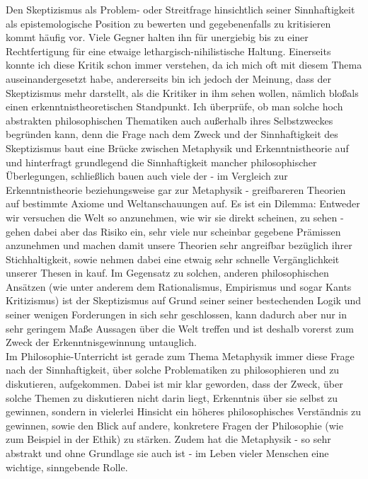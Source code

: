 \documentclass[12pt,a4paper,final]{article}
\begin{document}
Den Skeptizismus als Problem- oder Streitfrage hinsichtlich seiner Sinnhaftigkeit als epistemologische Position zu bewerten und gegebenenfalls zu kritisieren kommt häufig vor. Viele Gegner halten ihn für unergiebig bis zu einer Rechtfertigung für eine etwaige lethargisch-nihilistische Haltung. Einerseits konnte ich diese Kritik schon immer verstehen, da ich mich oft mit diesem Thema auseinandergesetzt habe, andererseits bin ich jedoch der Meinung, dass der Skeptizismus mehr darstellt, als die Kritiker in ihm sehen wollen, nämlich \glqq bloß\grqq als einen erkenntnistheoretischen Standpunkt.%
Ich überprüfe, ob man solche hoch abstrakten philosophischen Thematiken auch außerhalb ihres Selbstzweckes begründen kann, %
denn die Frage nach dem Zweck und der Sinnhaftigkeit des Skeptizismus baut eine Brücke zwischen Metaphysik und Erkenntnistheorie auf und hinterfragt grundlegend die Sinnhaftigkeit mancher philosophischer Überlegungen, schließlich bauen auch viele der - im Vergleich zur Erkenntnistheorie beziehungsweise gar zur Metaphysik - greifbareren Theorien auf bestimmte Axiome und Weltanschauungen auf. Es ist ein Dilemma: Entweder wir versuchen die Welt so anzunehmen, wie wir sie direkt scheinen, zu sehen - gehen dabei aber das Risiko ein, sehr viele nur scheinbar gegebene Prämissen anzunehmen und machen damit unsere Theorien sehr angreifbar bezüglich ihrer Stichhaltigkeit, sowie nehmen dabei eine etwaig sehr schnelle Vergänglichkeit unserer Thesen in kauf.
Im Gegensatz zu solchen, anderen philosophischen Ansätzen (wie unter anderem dem Rationalismus, Empirismus und sogar Kants Kritizismus) ist der Skeptizismus auf Grund seiner seiner bestechenden Logik und seiner wenigen Forderungen in sich sehr geschlossen, kann dadurch aber nur in sehr geringem Maße Aussagen über die Welt treffen und ist deshalb vorerst zum Zweck der Erkenntnisgewinnung untauglich.\\ %

%
%
Im Philosophie-Unterricht ist gerade zum Thema Metaphysik immer diese Frage nach der Sinnhaftigkeit, über solche Problematiken zu philosophieren und zu diskutieren, aufgekommen. %
Dabei ist mir klar geworden, dass der Zweck, über solche Themen zu diskutieren nicht darin liegt, Erkenntnis über sie selbst zu gewinnen, sondern in vielerlei Hinsicht ein höheres philosophisches Verständnis zu gewinnen, sowie den Blick auf andere, konkretere Fragen der Philosophie (wie zum Beispiel in der Ethik) zu stärken. Zudem hat die Metaphysik - so sehr abstrakt und ohne Grundlage sie auch ist - im Leben vieler Menschen eine wichtige, sinngebende Rolle.
\end{document}
